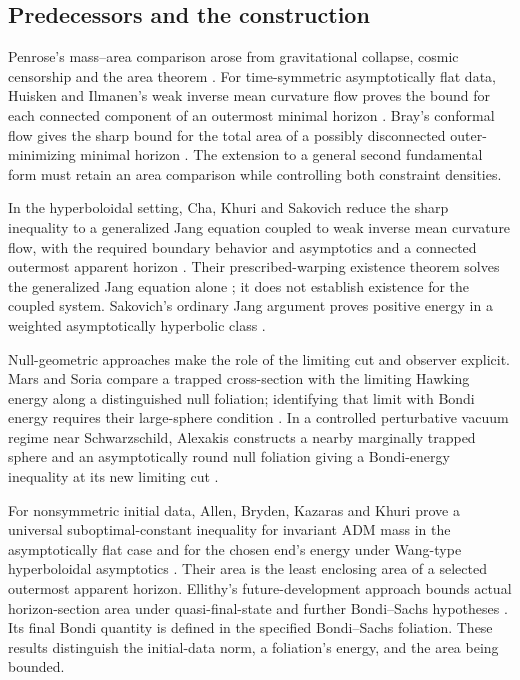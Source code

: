 \subsection{Predecessors and the construction}
Penrose's mass--area comparison arose from gravitational collapse,
cosmic censorship and the area theorem \cite{Penrose}.
For time-symmetric asymptotically flat data, Huisken and Ilmanen's
weak inverse mean curvature flow proves the bound for each connected
component of an outermost minimal horizon \cite{HI}. Bray's conformal
flow gives the sharp bound for the total area of a possibly disconnected
outer-minimizing minimal horizon \cite{Bray}. The extension to a general
second fundamental form must retain an area comparison while controlling
both constraint densities.

In the hyperboloidal setting, Cha, Khuri and Sakovich reduce the sharp
inequality to a generalized Jang equation coupled to weak inverse mean
curvature flow, with the required boundary behavior and asymptotics and
a connected outermost apparent horizon \cite[Theorem~3.2]{CKS}.
Their prescribed-warping existence theorem solves the generalized Jang
equation alone \cite[Theorem~3.4]{CKS}; it does not establish existence
for the coupled system. Sakovich's ordinary Jang argument proves
positive energy in a weighted asymptotically hyperbolic class
\cite[Theorem~1.1]{Sakovich}.

Null-geometric approaches make the role of the limiting cut and observer
explicit. Mars and Soria compare a trapped cross-section with the
limiting Hawking energy along a distinguished null foliation;
identifying that limit with Bondi energy requires their large-sphere
condition \cite[Theorems~2--3]{MarsSoria}. In a controlled perturbative
vacuum regime near Schwarzschild, Alexakis constructs a nearby
marginally trapped sphere and an asymptotically round null foliation
giving a Bondi-energy inequality at its new limiting cut
\cite[Theorem~1.3 and Section~2.1]{Alexakis}.

For nonsymmetric initial data, Allen, Bryden, Kazaras and Khuri prove
a universal suboptimal-constant inequality for invariant ADM mass in
the asymptotically flat case and for the chosen end's energy under
Wang-type hyperboloidal asymptotics
\cite[Theorems~1.1 and~1.3]{ABKK}. Their area is the least enclosing
area of a selected outermost apparent horizon. Ellithy's
future-development approach bounds actual horizon-section area under
quasi-final-state and further Bondi--Sachs hypotheses
\cite[Theorem~4.12, Remark~4.14 and Theorem~C.1]{Ellithy}.
Its final Bondi quantity is defined in the specified Bondi--Sachs
foliation. These results distinguish the initial-data norm, a
foliation's energy, and the area being bounded.

